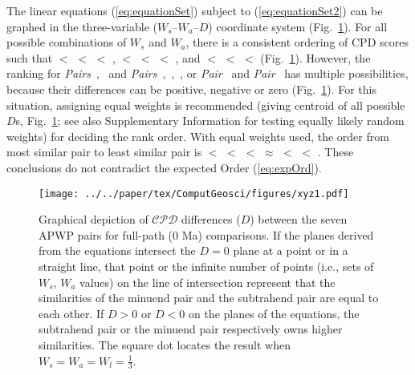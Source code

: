 The linear equations (\ref{eq:equationSet}) subject to (\ref{eq:equationSet2})
can be graphed in the three-variable ($W_s\textrm{--}W_a\textrm{--}D$)
coordinate system (Fig.~\ref{fig:pair-cmp}). For all possible combinations of
$W_s$ and $W_a$, there is a consistent ordering of CPD scores such that
\textbf{} $<$ \textbf{} $<$
\textbf{} $<$ \textbf{},
\textbf{} $<$ \textbf{} $<$
\textbf{} $<$ \textbf{}, and
\textbf{} $<$ \textbf{} $<$
\textbf{} $<$ \textbf{}
(Fig.~\ref{fig:pair-cmp}). However, the ranking for
\emph{Pairs}~\textbf{},~\textbf{} and
\emph{Pairs}~\textbf{},~\textbf{},~\textbf{},
or \emph{Pair}~\textbf{} and
\emph{Pair}~\textbf{} has multiple possibilities, because
their differences can be positive, negative or zero (Fig.~\ref{fig:pair-cmp}).
For this situation, assigning equal weights is recommended (giving centroid of
all possible $D$s, Fig.~\ref{fig:pair-cmp}; see also Supplementary Information
for testing equally likely random weights) for deciding the rank order. With
equal weights used, the order from most similar pair to least similar pair is
\textbf{} $<$ \textbf{} $<$
\textbf{} $<$ \textbf{} $\approx$
\textbf{} $<$ \textbf{} $<$
\textbf{}.
These conclusions do not contradict the expected Order (\ref{eq:expOrd}).

\begin{figure}[tbp]
\texttt{[image: ../../paper/tex/ComputGeosci/figures/xyz1.pdf]}
\caption[Criteria of pair comparisons]{Graphical depiction of $\mathcal{CPD}$
differences ($D$) between the seven APWP pairs for full-path (0
Ma) comparisons. If the planes derived from the equations intersect the $D=0$
plane at a point or in a straight line, that point or the infinite number of
points (i.e., sets of $W_s$, $W_a$ values) on the line of intersection represent
that the similarities of the minuend pair and the subtrahend pair are equal to
each other. If $D>0$ or $D<0$ on the planes of the equations, the subtrahend
pair or the minuend pair respectively owns higher similarities. The square dot
locates the result when $W_s=W_a=W_l=\frac{1}{3}$.}\label{fig:pair-cmp}
\end{figure}

